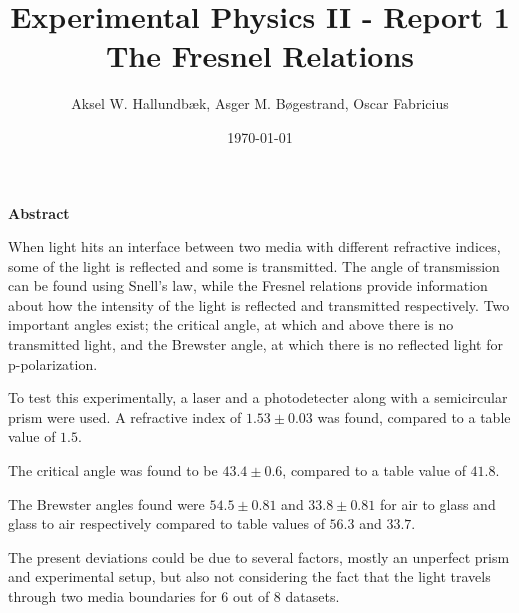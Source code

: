 \documentclass[a4paper,oneside,article]{memoir}
\begin{document}
\author{Aksel W. Hallundbæk, Asger M. Bøgestrand, Oscar Fabricius}
\title{Experimental Physics II - Report 1 \\ 
\Large{The Fresnel Relations}}
\date{\today}
\maketitle

\renewcommand{\bibname}{Bibliography}
\renewcommand{\figurename}{Figure}

\vspace{1cm}

\begin{center}
    \LARGE{\textbf{Abstract}}
\end{center}

When light hits an interface between two media with different refractive indices, some of the light is reflected and some is transmitted. The angle of transmission can be found using Snell's law, while the Fresnel relations provide information about how the intensity of the light is reflected and transmitted respectively. Two important angles exist; the critical angle, at which and above there is no transmitted light, and the Brewster angle, at which there is no reflected light for p-polarization.

To test this experimentally, a laser and a photodetecter along with a semicircular prism were used. A refractive index of $1.53\pm0.03$ was found, compared to a table value of $1.5$. 

The critical angle was found to be $43.4\pm0.6$, compared to a table value of $41.8$.

The Brewster angles found were $54.5\pm0.81$ and $33.8\pm0.81$ for air to glass and glass to air respectively compared to table values of $56.3$ and $33.7$.

The present deviations could be due to several factors, mostly an unperfect prism and experimental setup, but also not considering the fact that the light travels through two media boundaries for 6 out of 8 datasets.


\newpage
\end{document}
